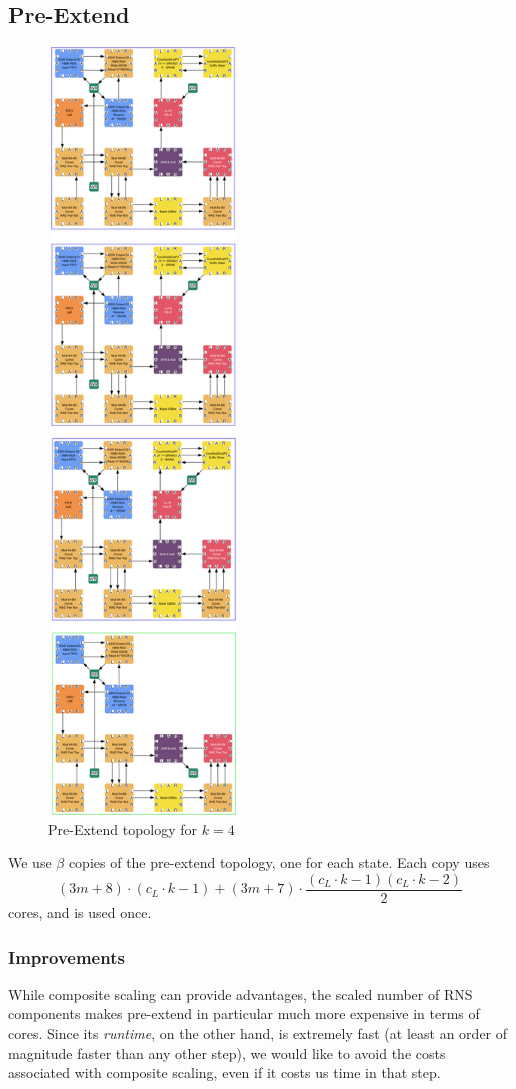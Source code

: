 \documentclass[../../fheimpl.tex]{subfiles}
\begin{document}
	\subsection{Pre-Extend}
	\begin{figure}[htb]
		\includegraphics[width=0.45\textwidth,height=8in,keepaspectratio]{graphics/extend.png}
		\caption{Pre-Extend topology for $k=4$}
		\label{fig:preextendtopo}
	\end{figure}
	We use $\beta$ copies of the pre-extend topology, one for each state. Each copy uses
	\[(3m+8)\cdot(c_L\cdot k-1)+(3m+7)\cdot\frac{(c_L\cdot k-1)(c_L\cdot k-2)}{2}\]
	cores, and is used once.
	
	\subsubsection{Improvements}
	While composite scaling can provide advantages, the scaled number of RNS components makes pre-extend in particular much more expensive in terms of cores. Since its \emph{runtime}, on the other hand, is extremely fast (at least an order of magnitude faster than any other step), we would like to avoid the costs associated with composite scaling, even if it costs us time in that step.
	
\end{document}
